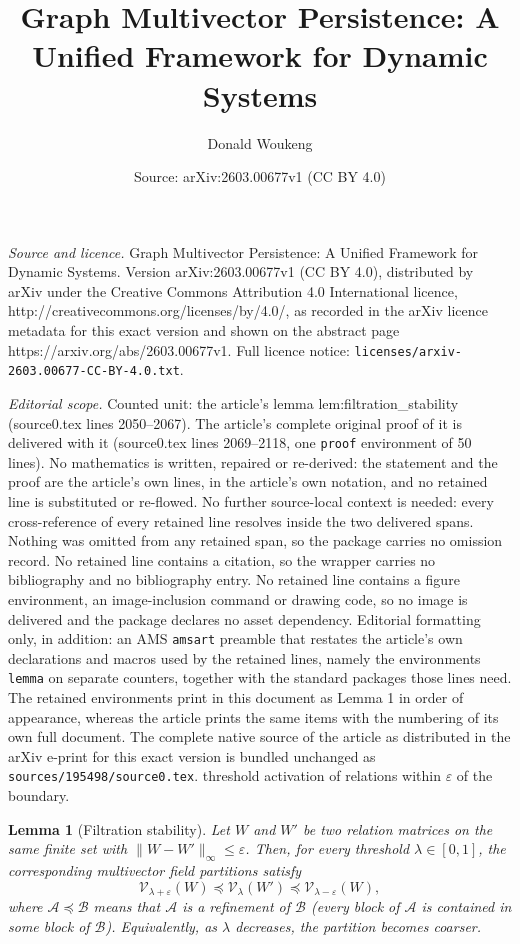 \documentclass[10pt,a4paper]{amsart}
\title{Graph Multivector Persistence: A Unified Framework for Dynamic Systems}
\author{Donald Woukeng}
\date{Source: arXiv:2603.00677v1 (CC BY 4.0)}
\newtheorem{lemma}{Lemma}
\begin{document}
\maketitle

\noindent\emph{Source and licence.} Graph Multivector Persistence: A Unified Framework for Dynamic Systems. Version arXiv:2603.00677v1 (CC BY 4.0), distributed by arXiv under the Creative Commons Attribution 4.0 International licence, http://creativecommons.org/licenses/by/4.0/, as recorded in the arXiv licence metadata for this exact version and shown on the abstract page https://arxiv.org/abs/2603.00677v1. Full licence notice: \texttt{licenses/arxiv-2603.00677-CC-BY-4.0.txt}.\par\smallskip

\noindent\textit{Editorial scope.} Counted unit: the article's lemma lem:filtration\_stability (source0.tex lines 2050--2067). The article's complete original proof of it is delivered with it (source0.tex lines 2069--2118, one \texttt{proof} environment of 50 lines). No mathematics is written, repaired or re-derived: the statement and the proof are the article's own lines, in the article's own notation, and no retained line is substituted or re-flowed.  No further source-local context is needed: every cross-reference of every retained line resolves inside the two delivered spans.  Nothing was omitted from any retained span, so the package carries no omission record.  No retained line contains a citation, so the wrapper carries no bibliography and no bibliography entry.  No retained line contains a figure environment, an image-inclusion command or drawing code, so no image is delivered and the package declares no asset dependency.  Editorial formatting only, in addition: an AMS \texttt{amsart} preamble that restates the article's own declarations and macros used by the retained lines, namely the environments \texttt{lemma} on separate counters, together with the standard packages those lines need.  The retained environments print in this document as Lemma 1 in order of appearance, whereas the article prints the same items with the numbering of its own full document.  The complete native source of the article as distributed in the arXiv e-print for this exact version is bundled unchanged as \texttt{sources/195498/source0.tex}.
threshold activation of relations within $\varepsilon$ of the boundary.\begin{lemma}[Filtration stability]
\label{lem:filtration_stability}
Let $W$ and $W'$ be two relation matrices on the same finite set
with $\|W - W'\|_\infty \le \varepsilon$.  
Then, for every threshold $\lambda \in [0,1]$, the corresponding
multivector field partitions satisfy
\[
\mathcal V_{\lambda+\varepsilon}(W)
  \preceq
\mathcal V_{\lambda}(W')
  \preceq
\mathcal V_{\lambda-\varepsilon}(W),
\]
where $\mathcal A \preceq \mathcal B$ means that
$\mathcal A$ is a \emph{refinement} of $\mathcal B$
(every block of $\mathcal A$ is contained in some block of $\mathcal B$).
Equivalently, as $\lambda$ decreases, the partition becomes coarser.
\end{lemma}
\end{document}
